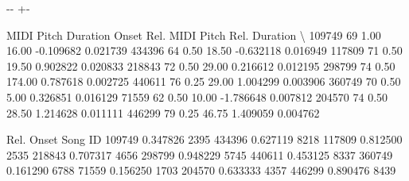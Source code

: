 \documentclass[letterpaper,10pt,english]{sphinxmanual}
\newlength\nbsphinxcodecellspacing
\begin{document}
{
\begin{sphinxVerbatim}[commandchars=\\\{\}]
\llap{\color{nbsphinxin}[51]:\,\hspace{\fboxrule}\hspace{\fboxsep}}
\end{sphinxVerbatim}
}

{

\kern-\sphinxverbatimsmallskipamount\kern-\baselineskip
\kern+\FrameHeightAdjust\kern-\fboxrule
\vspace{\nbsphinxcodecellspacing}

\begin{sphinxVerbatim}[commandchars=\\\{\}]
\llap{\color{nbsphinxout}[51]:\,\hspace{\fboxrule}\hspace{\fboxsep}}        MIDI Pitch  Duration   Onset  Rel. MIDI Pitch  Rel. Duration  \textbackslash{}
109749          69      1.00   16.00        -0.109682       0.021739
434396          64      0.50   18.50        -0.632118       0.016949
117809          71      0.50   19.50         0.902822       0.020833
218843          72      0.50   29.00         0.216612       0.012195
298799          74      0.50  174.00         0.787618       0.002725
440611          76      0.25   29.00         1.004299       0.003906
360749          70      0.50    5.00         0.326851       0.016129
71559           62      0.50   10.00        -1.786648       0.007812
204570          74      0.50   28.50         1.214628       0.011111
446299          79      0.25   46.75         1.409059       0.004762

        Rel. Onset  Song ID
109749    0.347826     2395
434396    0.627119     8218
117809    0.812500     2535
218843    0.707317     4656
298799    0.948229     5745
440611    0.453125     8337
360749    0.161290     6788
71559     0.156250     1703
204570    0.633333     4357
446299    0.890476     8439
\end{sphinxVerbatim}
}
\end{document}
